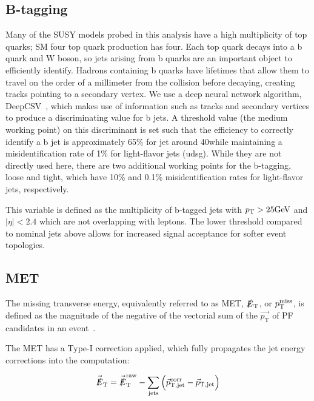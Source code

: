 \subsection{B-tagging}
Many of the SUSY models probed in this analysis have a high multiplicity of
top quarks; SM four top quark production has four. Each top quark decays into
a b quark and W boson, so jets arising from b quarks are an important object
to efficiently identify. Hadrons containing b quarks have lifetimes that
allow them to travel on the order of a millimeter from the collision before
decaying, creating tracks pointing to a secondary vertex. We use a deep
neural network algorithm, DeepCSV~\cite{CMS:Sirunyan2017ezt}, which makes use
of information such as tracks and secondary vertices to produce a
discriminating value for b jets. A threshold value (the medium working point)
on this discriminant is set such that the efficiency to correctly identify a
b jet is approximately 65\% for jet \pt around 40\GeV while maintaining a
misidentification rate of 1\% for light-flavor jets (udsg).
While they are not directly used here, there are two additional working points
for the b-tagging, loose and tight, which have 10\% and 0.1\% misidentification 
rates for light-flavor jets, respectively.

This \Nbjets variable is defined as the multiplicity 
of b-tagged jets with $p_{\mathrm{T}}>25\text{GeV}$ and $|\eta|<2.4$ which are
not overlapping with leptons. The lower threshold compared
to nominal jets above allows for increased signal acceptance for softer event
topologies.

\subsection{MET}

The missing transverse energy,
equivalently referred to as MET, $\slashed{E}_\mathrm{T}$, or $p_{\mathrm{T}}^\text{miss}$, is defined
as the magnitude of the negative of the vectorial sum of the $\vec{p_\mathrm{T}}$ of PF candidates in an
event~\cite{CMS:Sirunyan2019kia}.

The MET has a Type-I correction applied, which fully propagates
the jet energy corrections into the computation:

\begin{equation}
    \vec{\slashed{E}}_\mathrm{T}
    = \vec{\slashed{E}}_\mathrm{T}^\mathrm{raw}
    - \sum_{\mathrm{jets}} \left( 
        \vec{p}_\mathrm{T,jet}^\text{corr} 
        - \vec{p}_\mathrm{T,jet}
    \right)
\end{equation}

